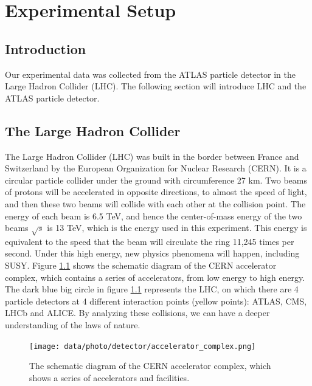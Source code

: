 \chapter{Experimental Setup}
\label{ch:detector}

\section{Introduction}
\label{sec:detector_introduction}

Our experimental data was collected from the ATLAS particle detector in the Large Hadron Collider (LHC).
The following section will introduce LHC and the ATLAS particle detector.

\section{The Large Hadron Collider}
\label{sec:detector_LHC}

The Large Hadron Collider (LHC) was built in the border between France and Switzerland by the European Organization for Nuclear Research (CERN).
It is a circular particle collider under the ground with circumference 27 km.
Two beams of protons will be accelerated in opposite directions, to almost the speed of light, and then these two beams will collide with each other at the collision point.
The energy of each beam is 6.5 TeV, and hence the center-of-mass energy of the two beams $\sqrt{s}$ is 13 TeV, which is the energy used in this experiment.
This energy is equivalent to the speed that the beam will circulate the ring 11,245 times per second.
Under this high energy, new physics phenomena will happen, including SUSY.
Figure \ref{fig:detector_LHC_accelerator_complex} shows the schematic diagram of the CERN accelerator complex, which contains a series of accelerators, from low energy to high energy.
The dark blue big circle in figure \ref{fig:detector_LHC_accelerator_complex} represents the LHC, on which there are 4 particle detectors at 4 different interaction points (yellow points): ATLAS, CMS, LHCb and ALICE.
By analyzing these collisions, we can have a deeper understanding of the laws of nature.

\begin{figure}
\centering
\texttt{[image: data/photo/detector/accelerator\_complex.png]}
\caption{The schematic diagram of the CERN accelerator complex, which shows a series of accelerators and facilities. \cite{complex}}
\label{fig:detector_LHC_accelerator_complex}
\end{figure}

